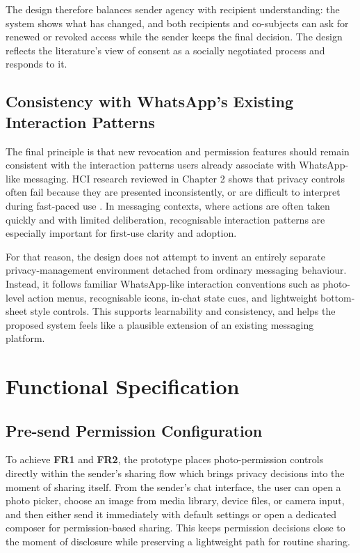 The design therefore balances sender agency with recipient understanding: the system shows what has changed, and both recipients and co-subjects can ask for renewed or revoked access while the sender keeps the final decision. The design reflects the literature's view of consent as a socially negotiated process and responds to it.

\subsection{Consistency with WhatsApp's Existing Interaction Patterns}
The final principle is that new revocation and permission features should remain consistent with the interaction patterns users already associate with WhatsApp-like messaging. HCI research reviewed in Chapter 2 shows that privacy controls often fail because they are presented inconsistently, or are difficult to interpret during fast-paced use \cite{albesher_2021,schaub_notice_2015,wilbanks_design_2018}. In messaging contexts, where actions are often taken quickly and with limited deliberation, recognisable interaction patterns are especially important for first-use clarity and adoption.

For that reason, the design does not attempt to invent an entirely separate privacy-management environment detached from ordinary messaging behaviour. Instead, it follows familiar WhatsApp-like interaction conventions such as photo-level action menus, recognisable icons, in-chat state cues, and lightweight bottom-sheet style controls. This supports learnability and consistency, and helps the proposed system feels like a plausible extension of an existing messaging platform. 

\section{Functional Specification}

\subsection{Pre-send Permission Configuration}
To achieve \textbf{FR1} and \textbf{FR2}, the prototype places photo-permission controls directly within the sender’s sharing flow which brings privacy decisions into the moment of sharing itself. From the sender’s chat interface, the user can open a photo picker, choose an image from media library, device files, or camera input, and then either send it immediately with default settings or open a dedicated composer for permission-based sharing. This keeps permission decisions close to the moment of disclosure while preserving a lightweight path for routine sharing.

